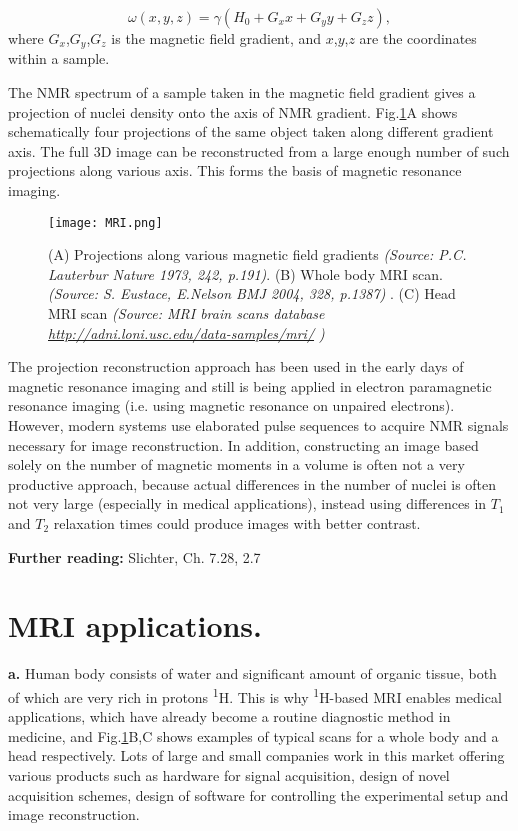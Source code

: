 \documentclass[a4paper, 12pt]{article}
\begin{document}
\begin{equation}
\omega(x,y,z) = \gamma (H_0 + G_x x + G_y y + G_z z),
\end{equation}
where $G_x$,$G_y$,$G_z$ is the magnetic field gradient, and $x$,$y$,$z$ are the coordinates within a sample.

The NMR spectrum of a sample taken in the magnetic field gradient gives a projection of nuclei density onto the axis of NMR gradient. Fig.\ref{fig:MRI}A shows schematically four projections of the same object taken along different gradient axis. The full 3D image can be reconstructed from a large enough number of such projections along various axis. This forms the basis of magnetic resonance imaging. 

\begin{figure}[ht]
\caption{(A) Projections along various magnetic field gradients \textit{(Source: P.C. Lauterbur Nature 1973, 242, p.191)}. (B) Whole body MRI scan. \textit{(Source: S. Eustace, E.Nelson BMJ 2004, 328, p.1387) }. (C) Head MRI scan \textit{(Source: MRI brain scans database \url{http://adni.loni.usc.edu/data-samples/mri/} )} }
\label{fig:MRI}
\centering
\texttt{[image: MRI.png]}
\end{figure}

  The projection reconstruction approach has been used in the early days of magnetic resonance imaging and still is being applied in electron paramagnetic resonance imaging (i.e. using magnetic resonance on unpaired electrons). However, modern systems use elaborated pulse sequences to acquire NMR signals necessary for image reconstruction.
  In addition, constructing an image based solely on the number of magnetic moments in a volume is often not a very productive approach, because actual differences in the number of nuclei is often not very large (especially in medical applications), instead using differences in $T_1$ and $T_2$ relaxation times could produce images with better contrast.
  
\textbf{Further reading:} Slichter, Ch. 7.28, 2.7
  
  
\section{MRI applications.}
  \textbf{a.} Human body consists of water and significant amount of organic tissue, both of which are very rich in protons \textsuperscript{1}H. This is why \textsuperscript{1}H-based MRI enables medical applications, which have already become a routine diagnostic method in medicine, and Fig.\ref{fig:MRI}B,C shows examples of typical scans for a whole body and a head respectively. Lots of large and small companies work in this market offering various products such as hardware for signal acquisition, design of novel acquisition schemes, design of software for controlling the experimental setup and image reconstruction.
  
\end{document}
